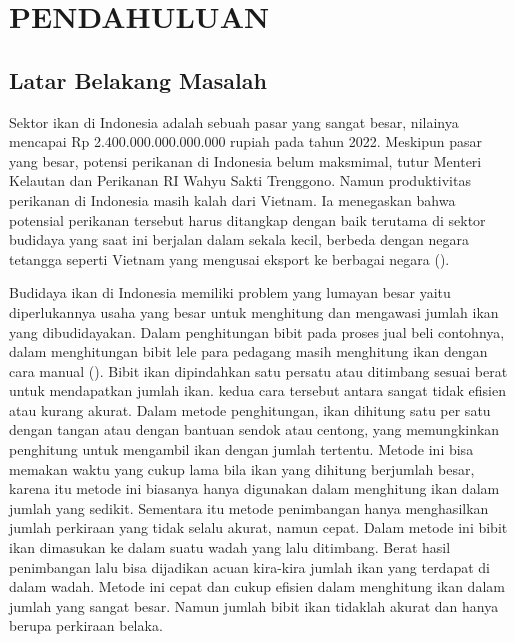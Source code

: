 
\chapter{PENDAHULUAN}

\section{Latar Belakang Masalah}

Sektor ikan di Indonesia adalah sebuah pasar yang sangat besar, nilainya mencapai 
Rp 2.400.000.000.000.000 rupiah pada tahun 2022. Meskipun pasar yang besar, potensi 
perikanan di Indonesia belum maksmimal, tutur Menteri Kelautan dan Perikanan RI Wahyu Sakti Trenggono. 
Namun produktivitas perikanan di Indonesia masih kalah dari Vietnam. 
Ia menegaskan bahwa potensial perikanan tersebut harus ditangkap dengan baik terutama 
di sektor budidaya yang saat ini berjalan dalam sekala kecil, berbeda dengan negara 
tetangga seperti Vietnam yang mengusai eksport ke berbagai negara (\cite{harianjogja}).

Budidaya ikan di Indonesia memiliki problem yang lumayan besar yaitu 
diperlukannya usaha yang besar untuk menghitung dan mengawasi jumlah ikan 
yang dibudidayakan. Dalam penghitungan bibit pada proses jual beli contohnya, 
dalam menghitungan bibit lele para pedagang masih menghitung ikan dengan 
cara manual (\cite{alamri}). Bibit ikan dipindahkan satu persatu atau 
ditimbang sesuai berat untuk mendapatkan jumlah ikan. kedua cara tersebut antara 
sangat tidak efisien atau kurang akurat. Dalam metode penghitungan, ikan 
dihitung satu per satu dengan tangan atau dengan bantuan sendok atau centong, 
yang memungkinkan penghitung untuk mengambil ikan dengan jumlah tertentu. 
Metode ini bisa memakan waktu yang cukup lama bila ikan yang dihitung 
berjumlah besar, karena itu metode ini biasanya hanya digunakan 
dalam menghitung ikan dalam jumlah yang sedikit. Sementara itu metode 
penimbangan hanya menghasilkan jumlah perkiraan yang tidak 
selalu akurat, namun cepat. Dalam metode ini bibit ikan dimasukan ke dalam suatu wadah 
yang lalu ditimbang. Berat hasil penimbangan lalu bisa 
dijadikan acuan kira-kira jumlah ikan yang terdapat di dalam wadah. 
Metode ini cepat dan cukup efisien dalam menghitung ikan dalam jumlah yang 
sangat besar. Namun jumlah bibit ikan tidaklah akurat dan hanya berupa perkiraan belaka.

